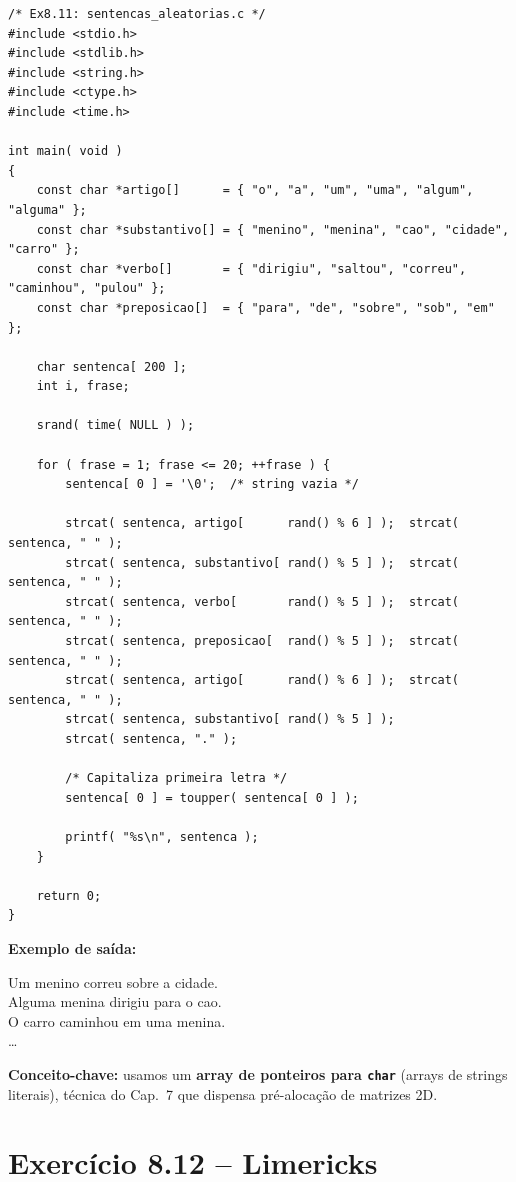 \documentclass[12pt,a4paper]{article}
\begin{document}
\begin{respostabox}
\begin{lstlisting}
/* Ex8.11: sentencas_aleatorias.c */
#include <stdio.h>
#include <stdlib.h>
#include <string.h>
#include <ctype.h>
#include <time.h>

int main( void )
{
    const char *artigo[]      = { "o", "a", "um", "uma", "algum", "alguma" };
    const char *substantivo[] = { "menino", "menina", "cao", "cidade", "carro" };
    const char *verbo[]       = { "dirigiu", "saltou", "correu", "caminhou", "pulou" };
    const char *preposicao[]  = { "para", "de", "sobre", "sob", "em" };

    char sentenca[ 200 ];
    int i, frase;

    srand( time( NULL ) );

    for ( frase = 1; frase <= 20; ++frase ) {
        sentenca[ 0 ] = '\0';  /* string vazia */

        strcat( sentenca, artigo[      rand() % 6 ] );  strcat( sentenca, " " );
        strcat( sentenca, substantivo[ rand() % 5 ] );  strcat( sentenca, " " );
        strcat( sentenca, verbo[       rand() % 5 ] );  strcat( sentenca, " " );
        strcat( sentenca, preposicao[  rand() % 5 ] );  strcat( sentenca, " " );
        strcat( sentenca, artigo[      rand() % 6 ] );  strcat( sentenca, " " );
        strcat( sentenca, substantivo[ rand() % 5 ] );
        strcat( sentenca, "." );

        /* Capitaliza primeira letra */
        sentenca[ 0 ] = toupper( sentenca[ 0 ] );

        printf( "%s\n", sentenca );
    }

    return 0;
}
\end{lstlisting}

\textbf{Exemplo de saída:}
\begin{saida}
Um menino correu sobre a cidade.\\
Alguma menina dirigiu para o cao.\\
O carro caminhou em uma menina.\\
\ldots
\end{saida}

\textbf{Conceito-chave:} usamos um \textbf{array de ponteiros para \texttt{char}}
(arrays de strings literais), técnica do Cap.~7 que dispensa pré-alocação de
matrizes 2D.
\end{respostabox}

\section{Exercício 8.12 -- Limericks}
\end{document}
